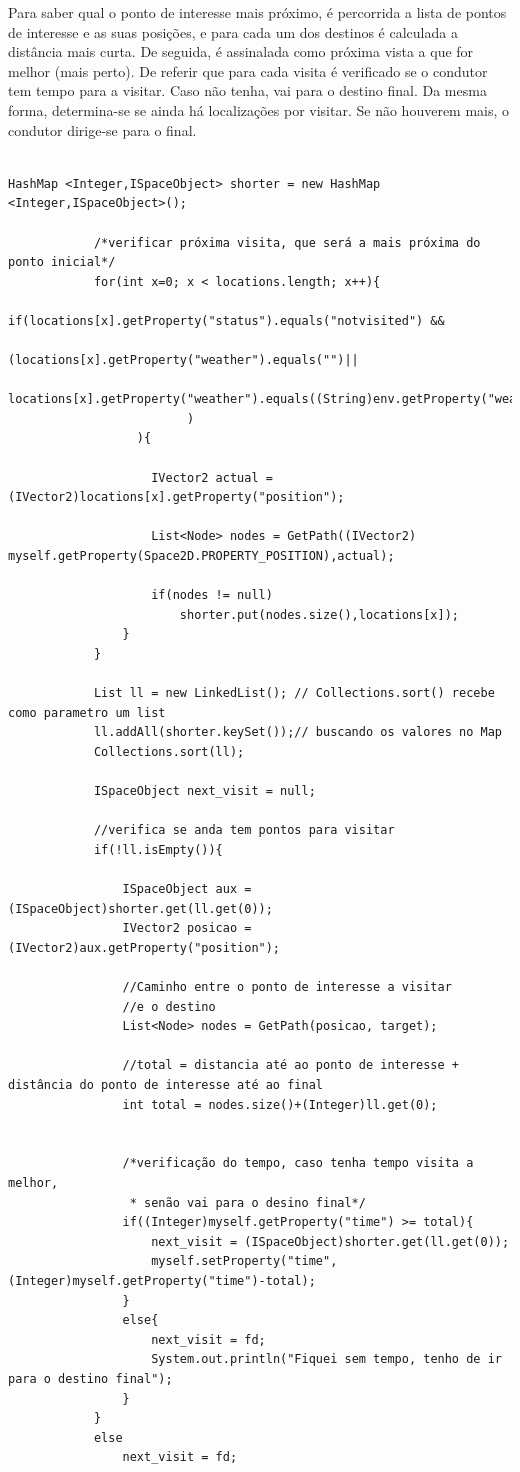 \documentclass[15pt,a4paper]{article}
\begin{document}
Para saber qual o ponto de interesse mais próximo, é percorrida a lista de pontos de interesse e as suas posições, e para cada um dos destinos é calculada a distância mais curta. De seguida, é assinalada como próxima vista a que for melhor (mais perto). De referir que para cada visita é verificado se o condutor tem tempo para a visitar. Caso não tenha, vai para o destino final. Da mesma forma, determina-se se ainda há localizações por visitar. Se não houverem mais, o condutor dirige-se para o final.

\begin{verbatim}

HashMap <Integer,ISpaceObject> shorter = new HashMap <Integer,ISpaceObject>();

			/*verificar próxima visita, que será a mais próxima do ponto inicial*/
			for(int x=0; x < locations.length; x++){
				if(locations[x].getProperty("status").equals("notvisited") &&
						(locations[x].getProperty("weather").equals("")||
						 locations[x].getProperty("weather").equals((String)env.getProperty("weather"))
						 ) 
				  ){

					IVector2 actual = (IVector2)locations[x].getProperty("position");

					List<Node> nodes = GetPath((IVector2) myself.getProperty(Space2D.PROPERTY_POSITION),actual);

					if(nodes != null)
						shorter.put(nodes.size(),locations[x]);					
				}
			}

			List ll = new LinkedList(); // Collections.sort() recebe como parametro um list  
			ll.addAll(shorter.keySet());// buscando os valores no Map  
			Collections.sort(ll);

			ISpaceObject next_visit = null;

			//verifica se anda tem pontos para visitar
			if(!ll.isEmpty()){

				ISpaceObject aux = (ISpaceObject)shorter.get(ll.get(0));
				IVector2 posicao = (IVector2)aux.getProperty("position");

				//Caminho entre o ponto de interesse a visitar
				//e o destino
				List<Node> nodes = GetPath(posicao, target);
				
				//total = distancia até ao ponto de interesse + distância do ponto de interesse até ao final
				int total = nodes.size()+(Integer)ll.get(0);
				
				
				/*verificação do tempo, caso tenha tempo visita a melhor,
				 * senão vai para o desino final*/
				if((Integer)myself.getProperty("time") >= total){
					next_visit = (ISpaceObject)shorter.get(ll.get(0));
					myself.setProperty("time", (Integer)myself.getProperty("time")-total);
				}
				else{
					next_visit = fd;
					System.out.println("Fiquei sem tempo, tenho de ir para o destino final");
				}
			}
			else 
				next_visit = fd;

\end{verbatim}
\end{document}
